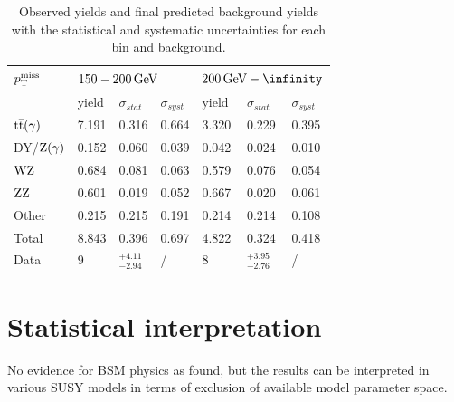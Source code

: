 \begin{table}[tbp]
 \centering
 \caption{Observed yields and final predicted background yields with the statistical and systematic uncertainties for each bin and background.}
 \normalsize
 \label{tab:results}
 \begin{tabular}{lllllll}
  $p_{\mathrm{T}}^\text{miss}$      & \multicolumn{3}{l}{$150-200\,\text{Ge\hspace{-.08em}V}$} & \multicolumn{3}{l}{$200\GeV-\infinity$}                                                                  \\\hline
                 & yield                             & $\sigma_{stat}$                         & $\sigma_{syst}$ & yield & $\sigma_{stat}$    & $\sigma_{syst}$ \\\hline
  ${\mathrm{t}\overline{\mathrm{t}}}(\gamma)$ & 7.191                             & 0.316                                   & 0.664           & 3.320 & 0.229              & 0.395           \\
  DY/$\mathrm{Z}(\gamma)$ & 0.152                             & 0.060                                   & 0.039           & 0.042 & 0.024              & 0.010           \\
  $\mathrm{W}\mathrm{Z}$       & 0.684                             & 0.081                                   & 0.063           & 0.579 & 0.076              & 0.054           \\
  $\mathrm{Z}\mathrm{Z}$       & 0.601                             & 0.019                                   & 0.052           & 0.667 & 0.020              & 0.061           \\
  Other          & 0.215                             & 0.215                                   & 0.191           & 0.214 & 0.214              & 0.108           \\\hline
  Total          & 8.843                             & 0.396                                   & 0.697           & 4.822 & 0.324              & 0.418           \\\hline
  Data           & 9                                 & $^{+4.11}_{-2.94}$                      & /               & 8     & $^{+3.95}_{-2.76}$ & /               \\\hline
 \end{tabular}
\end{table}


\section{Statistical interpretation}
No evidence for BSM physics as found, but the results can be interpreted in various SUSY models in terms of exclusion of available model parameter space.
